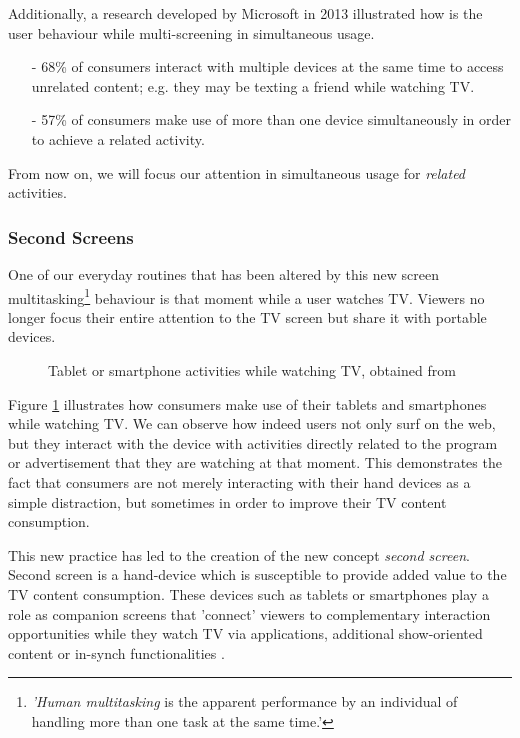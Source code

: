 \documentclass{acm_proc_article-sp}
\begin{document}
Additionally, a research developed by Microsoft in 2013 \cite{microsoftcross} illustrated how is the user behaviour while multi-screening in simultaneous usage.  

\begin{itemize}
  \item[-] 68\% of consumers interact with multiple devices at the same time to access unrelated content; e.g. they may be texting a friend while watching TV. 
  \item[-] 57\% of consumers make use of more than one device simultaneously in order to achieve a related activity. 
\end{itemize}

From now on, we will focus our attention in simultaneous usage for \textit{related} activities.
 	
\subsubsection{Second Screens}

One of our everyday routines that has been altered by this new screen multitasking\cite{wiki:multitask}\footnote{\textit{'Human multitasking} is the apparent performance by an individual of handling more than one task at the same time.'} behaviour is that moment while a user watches TV. Viewers no longer focus their entire attention to the TV screen but share it with portable devices. 

\begin{figure}[!htb]
	\centering
	\caption{Tablet or smartphone activities while watching TV, obtained from \cite{nielsentv}}
	\label{fig:nielsengraph}
\end{figure}

Figure \ref{fig:nielsengraph} illustrates how consumers make use of their tablets and smartphones while watching TV. We can observe how indeed users not only surf on the web, but they interact with the device with activities directly related to the program or advertisement that they are watching at that moment. This demonstrates the fact that consumers are not merely interacting with their hand devices as a simple distraction, but sometimes in order to improve their TV content consumption. 

This new practice has led to the creation of the new concept \textit{second screen}. Second screen is a hand-device which is susceptible to provide added value to the TV content consumption. These devices such as tablets or smartphones play a role as companion
screens that 'connect' viewers to complementary interaction
opportunities while they watch TV via applications, additional
show-oriented content or in-synch functionalities \cite{evolumedia2}. 
\end{document}
